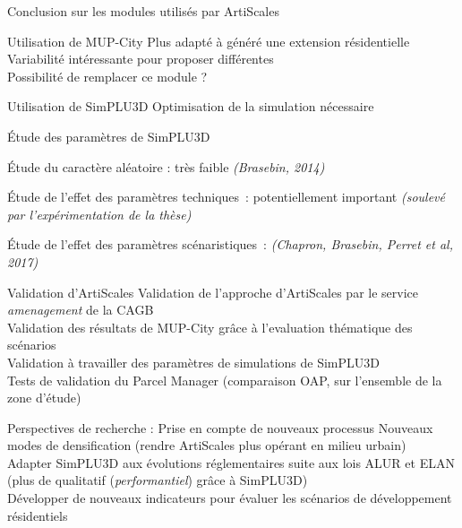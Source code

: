 \documentclass[xcolor=table]{beamer}
\begin{document}
\begin{frame}{Conclusion sur les modules utilisés par ArtiScales}
	\begin{block}{Utilisation de MUP-City}
		Plus adapté à généré une extension résidentielle
		\\
		Variabilité intéressante pour proposer différentes 
		\\
		Possibilité de remplacer ce module ? 
	\end{block}
	\begin{block}{Utilisation de SimPLU3D}
		Optimisation de la simulation nécessaire
	\end{block}
	\begin{block}{Étude des paramètres de SimPLU3D}
		\begin{block}{}
			Étude du caractère aléatoire : très faible \textit{(Brasebin, 2014)}
		\end{block}
		\begin{block}{}
			Étude de l'effet des paramètres techniques~: potentiellement important \textit{(soulevé par l'expérimentation de la thèse)}
		\end{block}
		\begin{block}{}
			Étude de l'effet des paramètres scénaristiques~: \textit{(Chapron, Brasebin, Perret et al, 2017)}
		\end{block}
	\end{block}
\end{frame}

\begin{frame}{Validation d'ArtiScales}
	Validation de l'approche d'ArtiScales par le service \textit{amenagement} de la CAGB
\\
Validation des résultats de MUP-City grâce à l'evaluation thématique des scénarios
\\
Validation à travailler des paramètres de simulations de SimPLU3D
\\
Tests de validation du Parcel Manager (comparaison OAP, sur l'ensemble de la zone d'étude)
\end{frame}

\begin{frame}{Perspectives de recherche : Prise en compte de nouveaux processus}
	Nouveaux modes de densification (rendre ArtiScales plus opérant en milieu urbain)
	\\
	Adapter SimPLU3D aux évolutions réglementaires suite aux lois ALUR et ELAN (plus de qualitatif (\textit{performantiel}) grâce à SimPLU3D)
	\\
	Développer de nouveaux indicateurs pour évaluer les scénarios de développement résidentiels
\end{frame}
\end{document}
